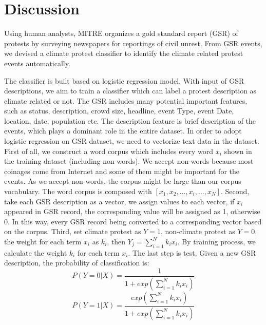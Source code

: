 \documentclass[9pt,twocolumn,twoside]{pnas-new}
\begin{document}
\section*{Discussion}


Using human analysts, MITRE organizes a gold standard report (GSR) of protests by surveying newspapers for reportings of civil unrest. From GSR events, we devised a climate protest classifier to identify the climate related protest events automatically.

The classifier is built based on logistic regression model. With input of GSR descriptions, we aim to train a classifier which can label a protest description as climate related or not. The GSR includes many potential important features, such as status, description, crowd size, headline, event Type, event Date, location, date, population etc. The description feature is brief description of the events, which plays a dominant role in the entire dataset. In order to adopt logistic regression on GSR dataset, we need to vectorize text data in the dataset. First of all, we construct a word corpus which includes every word $x_i$ shown in the training dataset (including non-words). We accept non-words because most coinages come from Internet and some of them might be important for the events. As we accept non-words, the corpus might be large than our corpus vocabulary. The word corpus is composed with $[x_1, x_2, ..., x_i, ..., x_N]$.
Second, take each GSR description as a vector, we assign values to each vector, if $x_i$ appeared in GSR record, the corresponding value will be assigned as 1, otherwise 0. In this way, every GSR record being converted to a corresponding vector based on the corpus. Third, set climate protest as $Y=1$, non-climate protest as $Y=0$, the weight for each term $x_i$ as $k_i$, then $Y_j = \sum_{i=1}^{N} k_i x_i $. By training process, we calculate the weight $k_i$ for each term $x_i$. The last step is test. Given a new GSR description, the probability of classification is:
$$P(Y = 0| X)= \frac{1}{1+exp( {\sum_{i=1}^{N} k_ix_i})}$$
$$P(Y = 1| X)= \frac{exp( {\sum_{i=1}^{N} k_ix_i})}{1+exp( {\sum_{i=1}^{N} k_ix_i})}$$
\end{document}
